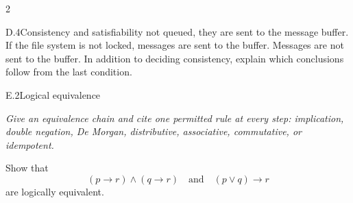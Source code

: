 \documentclass[9pt]{extarticle}
\begin{document}
\begin{multicols}{2}
\begin{CoreProblem}{D.4}{Consistency and satisfiability}
not queued, they are sent to the message buffer. If the file system is not
locked, messages are sent to the buffer. Messages are not sent to the buffer.
In addition to deciding consistency, explain which conclusions follow from the
last condition.
\end{CoreProblem}
\begin{CoreProblem}{E.2}{Logical equivalence}
{\scriptsize\textit{Give an equivalence chain and cite one permitted rule at every step: implication, double negation, De Morgan, distributive, associative, commutative, or idempotent.}\par}
Show that
\[
  (p\to r)\land(q\to r)
  \quad\text{and}\quad
  (p\lor q)\to r
\]
are logically equivalent.
\end{CoreProblem}
\end{multicols}
\CoreWorkArea
\FormBreak
{}
\end{document}
